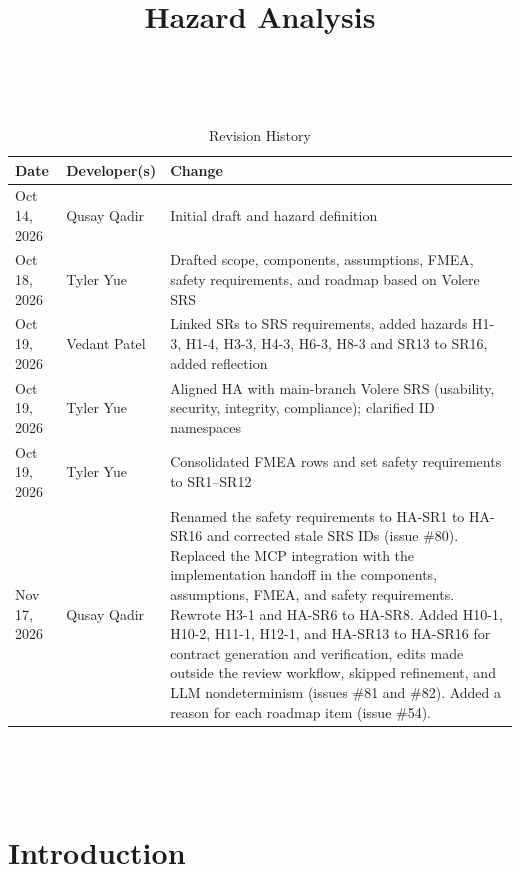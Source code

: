 \documentclass{article}
\title{Hazard Analysis\\\progname}
\author{\authname}
\date{}
\begin{document}
\maketitle
\thispagestyle{empty}

~\newpage


\begin{table}[hp]
\caption{Revision History} \label{TblRevisionHistory}
\begin{tabularx}{\textwidth}{llX}
\toprule
\textbf{Date} & \textbf{Developer(s)} & \textbf{Change}\\
\midrule
Oct 14, 2026 & Qusay Qadir & Initial draft and hazard definition\\
Oct 18, 2026 & Tyler Yue & Drafted scope, components, assumptions, FMEA,
safety requirements, and roadmap based on Volere SRS\\
Oct 19, 2026 & Vedant Patel & Linked SRs to SRS requirements, added hazards
H1-3, H1-4, H3-3, H4-3, H6-3, H8-3 and SR13 to SR16, added reflection\\
Oct 19, 2026 & Tyler Yue & Aligned HA with main-branch Volere SRS (usability,
security, integrity, compliance); clarified ID namespaces\\
Oct 19, 2026 & Tyler Yue & Consolidated FMEA rows and set safety requirements
to SR1--SR12\\
Nov 17, 2026 & Qusay Qadir & Renamed the safety requirements to HA-SR1 to
HA-SR16 and corrected stale SRS IDs (issue \#80). Replaced the MCP integration
with the implementation handoff in the components, assumptions, FMEA, and
safety requirements. Rewrote H3-1 and HA-SR6 to HA-SR8. Added H10-1, H10-2,
H11-1, H12-1, and HA-SR13 to HA-SR16 for contract generation and verification,
edits made outside the review workflow, skipped refinement, and LLM
nondeterminism (issues \#81 and \#82). Added a reason for each roadmap item (issue \#54).\\
\bottomrule
\end{tabularx}
\end{table}

~\newpage

\tableofcontents

~\newpage


\section{Introduction}
\end{document}

